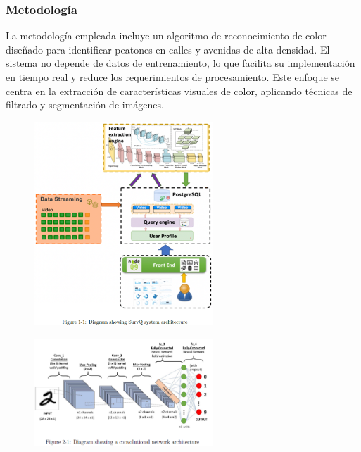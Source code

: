 \documentclass[listof=nochaptergap,12pt,times,authoryear]{report}
\begin{document}
\subsubsection{Metodología}
La metodología empleada incluye un algoritmo de reconocimiento de color diseñado para identificar peatones en calles y avenidas de alta densidad. El sistema no depende de datos de entrenamiento, lo que facilita su implementación en tiempo real y reduce los requerimientos de procesamiento. Este enfoque se centra en la extracción de características visuales de color, aplicando técnicas de filtrado y segmentación de imágenes.

\begin{figure}[h] %
    \centering
    \includegraphics[width=0.6\textwidth]{met6.png} %
    \label{fig:ejemplo} %
\end{figure}

\begin{figure}[h] %
    \centering
    \includegraphics[width=0.6\textwidth]{met6.1.png} %
    \label{fig:ejemplo} %
\end{figure}
\end{document}
